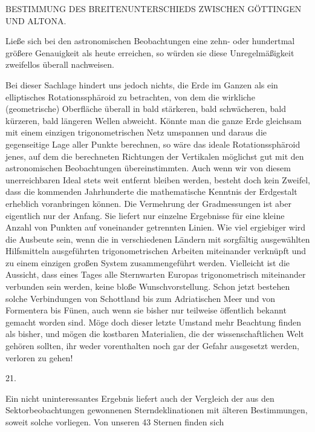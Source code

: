 \clearpage
\noindent{}\parbox[t]{\dimexpr\textwidth-10mm\relax}{\centering\scriptsize BESTIMMUNG DES BREITENUNTERSCHIEDS ZWISCHEN GÖTTINGEN UND ALTONA.}\par
\noindent Ließe sich bei den astronomischen Beobachtungen eine zehn- oder hundertmal größere Genauigkeit als heute erreichen, so würden sie diese Unregelmäßigkeit zweifellos überall nachweisen.

Bei dieser Sachlage hindert uns jedoch nichts, die Erde im Ganzen als ein elliptisches Rotationssphäroid zu betrachten, von dem die wirkliche (geometrische) Oberfläche überall in bald stärkeren, bald schwächeren, bald kürzeren, bald längeren Wellen abweicht. Könnte man die ganze Erde gleichsam mit einem einzigen trigonometrischen Netz umspannen und daraus die gegenseitige Lage aller Punkte berechnen, so wäre das ideale Rotationssphäroid jenes, auf dem die berechneten Richtungen der Vertikalen möglichst gut mit den astronomischen Beobachtungen übereinstimmten. Auch wenn wir von diesem unerreichbaren Ideal stets weit entfernt bleiben werden, besteht doch kein Zweifel, dass die kommenden Jahrhunderte die mathematische Kenntnis der Erdgestalt erheblich voranbringen können. Die Vermehrung der Gradmessungen ist aber eigentlich nur der Anfang. Sie liefert nur einzelne Ergebnisse für eine kleine Anzahl von Punkten auf voneinander getrennten Linien. Wie viel ergiebiger wird die Ausbeute sein, wenn die in verschiedenen Ländern mit sorgfältig ausgewählten Hilfsmitteln ausgeführten trigonometrischen Arbeiten miteinander verknüpft und zu einem einzigen großen System zusammengeführt werden. Vielleicht ist die Aussicht, dass eines Tages alle Sternwarten Europas trigonometrisch miteinander verbunden sein werden, keine bloße Wunschvorstellung. Schon jetzt bestehen solche Verbindungen von Schottland bis zum Adriatischen Meer und von Formentera bis Fünen, auch wenn sie bisher nur teilweise öffentlich bekannt gemacht worden sind. Möge doch dieser letzte Umstand mehr Beachtung finden als bisher, und mögen die kostbaren Materialien, die der wissenschaftlichen Welt gehören sollten, ihr weder vorenthalten noch gar der Gefahr ausgesetzt werden, verloren zu gehen!
\begin{center}21.\end{center}
Ein nicht uninteressantes Ergebnis liefert auch der Vergleich der aus den Sektorbeobachtungen gewonnenen Sterndeklinationen mit älteren Bestimmungen, soweit solche vorliegen. Von unseren 43 Sternen finden sich


